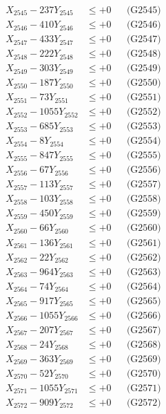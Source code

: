 \documentclass[a4paper,10pt]{article}
\begin{document}
{\begin{align}
X_{2545} - 237Y_{2545} &\leq +0 && \text{(G2545)} \\
X_{2546} - 410Y_{2546} &\leq +0 && \text{(G2546)} \\
X_{2547} - 433Y_{2547} &\leq +0 && \text{(G2547)} \\
X_{2548} - 222Y_{2548} &\leq +0 && \text{(G2548)} \\
X_{2549} - 303Y_{2549} &\leq +0 && \text{(G2549)} \\
X_{2550} - 187Y_{2550} &\leq +0 && \text{(G2550)} \\
\allowbreak
X_{2551} - 73Y_{2551} &\leq +0 && \text{(G2551)} \\
X_{2552} - 1055Y_{2552} &\leq +0 && \text{(G2552)} \\
X_{2553} - 685Y_{2553} &\leq +0 && \text{(G2553)} \\
X_{2554} - 8Y_{2554} &\leq +0 && \text{(G2554)} \\
X_{2555} - 847Y_{2555} &\leq +0 && \text{(G2555)} \\
X_{2556} - 67Y_{2556} &\leq +0 && \text{(G2556)} \\
X_{2557} - 113Y_{2557} &\leq +0 && \text{(G2557)} \\
X_{2558} - 103Y_{2558} &\leq +0 && \text{(G2558)} \\
X_{2559} - 450Y_{2559} &\leq +0 && \text{(G2559)} \\
X_{2560} - 66Y_{2560} &\leq +0 && \text{(G2560)} \\
\allowbreak
X_{2561} - 136Y_{2561} &\leq +0 && \text{(G2561)} \\
X_{2562} - 22Y_{2562} &\leq +0 && \text{(G2562)} \\
X_{2563} - 964Y_{2563} &\leq +0 && \text{(G2563)} \\
X_{2564} - 74Y_{2564} &\leq +0 && \text{(G2564)} \\
X_{2565} - 917Y_{2565} &\leq +0 && \text{(G2565)} \\
X_{2566} - 1055Y_{2566} &\leq +0 && \text{(G2566)} \\
X_{2567} - 207Y_{2567} &\leq +0 && \text{(G2567)} \\
X_{2568} - 24Y_{2568} &\leq +0 && \text{(G2568)} \\
X_{2569} - 363Y_{2569} &\leq +0 && \text{(G2569)} \\
X_{2570} - 52Y_{2570} &\leq +0 && \text{(G2570)} \\
\allowbreak
X_{2571} - 1055Y_{2571} &\leq +0 && \text{(G2571)} \\
X_{2572} - 909Y_{2572} &\leq +0 && \text{(G2572)} \\

\end{align}}
\end{document}
